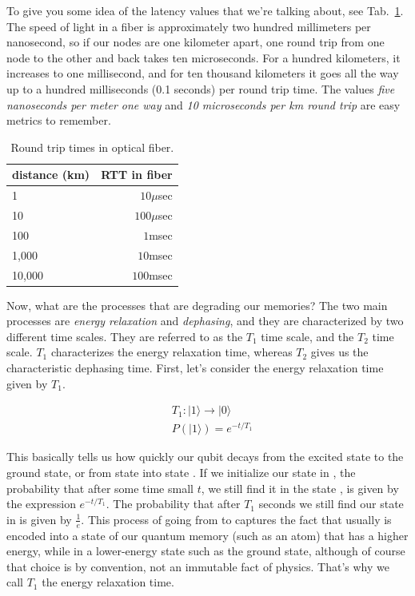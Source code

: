 To give you some idea of the latency values that we're talking about, see Tab.~\ref{tab:rtt}. The speed of light in a fiber is approximately two hundred millimeters per nanosecond, so if our nodes are one kilometer apart, one round trip from one node to the other and back takes ten microseconds. For a hundred kilometers, it increases to one millisecond, and for ten thousand kilometers it goes all the way up to a hundred milliseconds (0.1 seconds) per round trip time.  The values \emph{five nanoseconds per meter one way} and \emph{10 microseconds per km round trip} are easy metrics to remember.

\begin{table}
\centering
\begin{tabular}{l|r}
distance (km)  & RTT in fiber \\\hline
1     & $10\mu$sec \\
10    & $100\mu$sec \\
100   & $1$msec \\
1,000 & $10$msec \\
10,000 & $100$msec
\end{tabular}
\caption{Round trip times in optical fiber.}
\label{tab:rtt}
\end{table}

Now, what are the processes that are degrading our memories? The two main processes are \emph{energy relaxation} and \emph{dephasing}, and they are characterized by two different time scales. They are referred to as the $T_1$ time scale, and the $T_2$ time scale.  $T_1$ characterizes the energy relaxation time, whereas $T_2$ gives us the characteristic dephasing time. First, let's consider the energy relaxation time given by $T_1$.

\begin{equation}
\begin{aligned}
&T_1:|1\rangle \rightarrow|0\rangle \\
&P(|1\rangle)=e^{-t / T_1}
\end{aligned}
\end{equation}

This basically tells us how quickly our qubit decays from the excited state to the ground state, or from state  into state . If we initialize our state in , the probability that after some time small $t$, we still find it in the state , is given by the expression $e^{-t/T_1}$. The probability that after $T_1$ seconds we still find our state in  is given by $\frac{1}{e}$. This process of going from  to  captures the fact that usually  is encoded into a state of our quantum memory (such as an atom) that has a higher energy, while  in a lower-energy state such as the ground state, although of course that choice is by convention, not an immutable fact of physics.  That's why we call $T_1$ the energy relaxation time.

